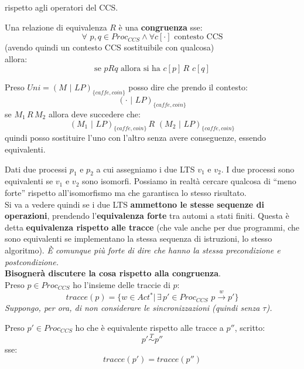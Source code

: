 \documentclass[a4paper,12pt, oneside]{book}
\begin{document}
rispetto agli operatori del CCS.\\
\begin{definizione}
  Una relazione di equivalenza $R$ è una \textbf{congruenza} sse:
  \[\forall \,\,p,q\in Proc_{CCS} \land \forall c[\cdot] \mbox{ contesto CCS}\]
  (avendo quindi un contesto CCS sostituibile con qualcosa)\\
  allora:
  \[\mbox{se }pRq\mbox{ allora si ha }c[p]\,R\,\,c[q]\]
\end{definizione}
\begin{esempio}
  Preso $Uni=(M\,\,|\,\,LP)_{\{caffe,coin\}}$ posso dire che prendo il contesto:
  \[(\cdot\,\,|\,\,LP)_{\{caffe,coin\}}\]
  se $M_1\,R\,M_2$ allora deve succedere che:
  \[(M_1\,\,|\,\,LP)_{\{caffe,coin\}}\,R\,\,(M_2\,\,|\,\,LP)_{\{caffe,coin\}}\]
  quindi posso sostituire l'uno con l'altro senza avere conseguenze, essendo
  equivalenti.
\end{esempio}
\begin{teorema}
  Dati due processi $p_1$ e $p_2$ a cui assegniamo i due LTS $v_1$ e $v_2$. I
  due processi sono equivalenti se $v_1$ e $v_2$ sono isomorfi. Possiamo in
  realtà cercare qualcosa di ``meno forte'' rispetto all'isomorfismo ma che
  garantisca lo stesso risultato.\\
  Si va a vedere quindi se i due LTS \textbf{ammettono le stesse sequenze di
    operazioni}, prendendo l'\textbf{equivalenza forte} tra automi a stati
  finiti. Questa è detta \textbf{equivalenza rispetto alle tracce} (che vale
  anche per due programmi, che sono equivalenti se implementano la stessa
  sequenza di istruzioni, lo stesso algoritmo). \textit{È comunque più forte di
    dire che hanno la stessa precondizione e postcondizione.}\\
  \textbf{Bisognerà discutere la cosa rispetto alla congruenza}.\\
   Preso $p\in Proc_{CCS}$ ho l'insieme delle traccie di $p$:
  \[tracce(p)=\{w\in Act^*|\,\exists\,p'\in Proc_{CCS}
    \,\,p\stackrel{w}{\rightarrow} p'\}\]
  \textit{Suppongo, per ora, di non considerare le sincronizzazioni (quindi
    senza $\tau$).} 
\end{teorema}
\begin{teorema}
  Preso $p'\in Proc_{CCS}$ ho che è equivalente rispetto alle tracce a $p''$,
  scritto:
  \[p'\stackrel{T}{\sim} p''\]
  sse:
  \[tracce(p')=tracce(p'')\]
\end{teorema}
\end{document}
